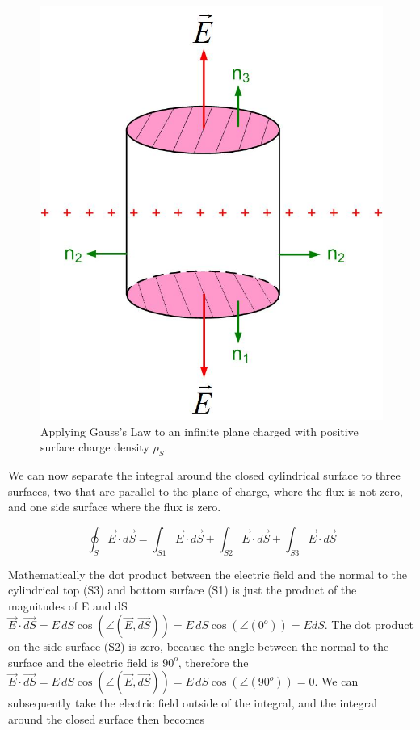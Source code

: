 \documentclass{ximera}
\begin{document}
\begin{figure}[htbp]
\begin{center}
\includegraphics[scale=0.5]{../jpg/infiniteplaneofcharge.jpg}
\end{center}
\caption{Applying Gauss's Law to an infinite plane charged with  positive surface charge density $\rho_S$.}
\label{fig:gaussPlane}
\end{figure}


We can now separate the integral around the closed cylindrical surface to three surfaces, two that are parallel to the plane of charge, where the flux is not zero, and one side surface where the flux is zero.

 
\begin{equation}
\oint_S \vec{E} \cdot \vec{dS} = \int_{S1}  \vec{E} \cdot \vec{dS} +\int_{S2}  \vec{E} \cdot \vec{dS}+\int_{S3}  \vec{E} \cdot \vec{dS} 
\end{equation}



 Mathematically the dot product between the electric field and the normal to the cylindrical top (S3) and bottom surface (S1) is just the product of the magnitudes of E and dS $\vec{E} \cdot \vec{dS}= E \,dS  \cos(\angle(\vec{E},\vec{dS}))= E \,dS  \cos(\angle(0^o)) =E dS$. The dot product on the side surface (S2) is zero, because the angle between the normal to the surface and the electric field is $90^o$, therefore the $\vec{E} \cdot \vec{dS}= E \,dS  \cos(\angle(\vec{E},\vec{dS}))= E \,dS  \cos(\angle(90^o)) =0$. We can subsequently take the electric field outside of the integral, and the integral around the closed surface then becomes
 
\end{document}
